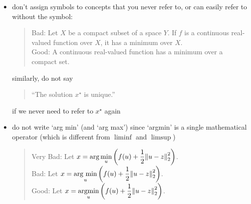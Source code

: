 \documentclass[usepdftitle=false]{beamer}
\begin{document}
\begin{frame}[t,fragile]
    \vspace*{1cm}

    \begin{itemize}\itemsep=10pt
        \item don't assign symbols to concepts that you never refer to, or can easily refer to without the symbol:
            \begin{quote}
                Bad: Let $X$ be a compact subset of a space $Y$. 
                If $f$ is a continuous real-valued function over $X$, it has a minimum over $X$. \\
                Good: A continuous real-valued function has a minimum over a compact set.
            \end{quote}
        similarly, do not say
        \begin{quote}
            ``The solution $x^\star$ is unique.''
        \end{quote}
        if we never need to refer to $x^\star$ again
        \item do not write `arg min' (and `arg max') since `argmin' is a single mathematical operator (which is different from $\liminf$ and $\limsup$)
            \begin{quote}
                Very Bad: Let $\displaystyle x = \text{arg} \min_u \left(f(u) + \frac{1}{2}{\lVert u - z \rVert}_2^2\right)$.\\
                Bad: Let $\displaystyle x = \mathop{\text{arg min}}_u \left(f(u) + \frac{1}{2}{\lVert u - z \rVert}_2^2\right)$.\\
                Good: Let $\displaystyle x = \mathop{\rm argmin}_u \left(f(u) + \frac{1}{2}{\lVert u - z \rVert}_2^2\right)$.
            \end{quote}
    \end{itemize}

\end{frame}
\end{document}
